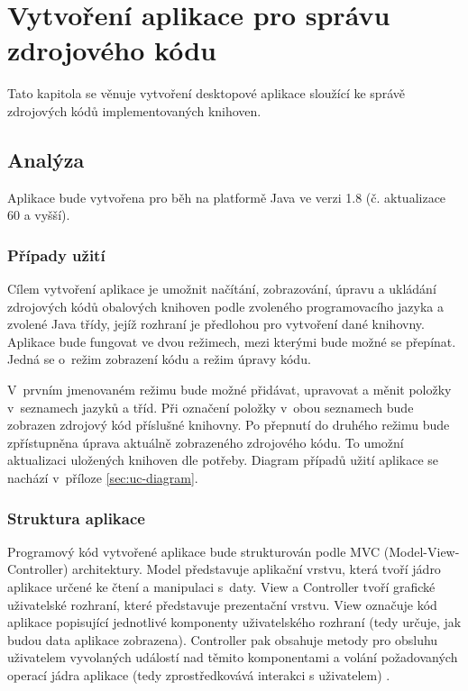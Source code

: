 \documentclass[czech,BP]{thesiskiv}
\begin{document}
\chapter{Vytvoření aplikace pro správu zdrojového kódu}
Tato kapitola se věnuje vytvoření desktopové aplikace sloužící ke správě zdrojových kódů implementovaných knihoven.

\section{Analýza}
Aplikace bude vytvořena pro běh na platformě Java ve verzi 1.8 (č. aktualizace 60 a vyšší).

\subsection{Případy užití}
Cílem vytvoření aplikace je umožnit načítání, zobrazování, úpravu a ukládání zdrojových kódů obalových knihoven podle zvoleného programovacího jazyka a zvolené Java třídy, jejíž rozhraní je předlohou pro vytvoření dané knihovny. Aplikace bude fungovat ve dvou režimech, mezi kterými bude možné se přepínat. Jedná se o~režim zobrazení kódu a režim úpravy kódu.\par
V~prvním jmenovaném režimu bude možné přidávat, upravovat a měnit položky v~seznamech jazyků a tříd. Při označení položky v~obou seznamech bude zobrazen zdrojový kód příslušné knihovny. Po přepnutí do druhého režimu bude zpřístupněna úprava aktuálně zobrazeného zdrojového kódu. To umožní aktualizaci uložených knihoven dle potřeby. Diagram případů užití aplikace se nachází v~příloze \ref{sec:uc-diagram}.

\subsection{Struktura aplikace}
Programový kód vytvořené aplikace bude strukturován podle MVC (Model-View-Controller) architektury. Model představuje aplikační vrstvu, která tvoří jádro aplikace určené ke čtení a manipulaci s~daty. View a Controller tvoří grafické uživatelské rozhraní, které představuje prezentační vrstvu. View označuje kód aplikace popisující jednotlivé komponenty uživatelského rozhraní (tedy určuje, jak budou data aplikace zobrazena). Controller pak obsahuje metody pro obsluhu uživatelem vyvolaných událostí nad těmito komponentami a volání požadovaných operací jádra aplikace (tedy zprostředkovává interakci s uživatelem) \cite{mvc-architecture}.
\end{document}
